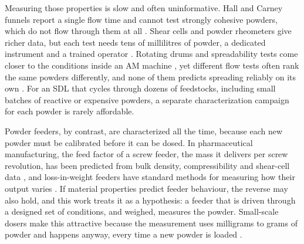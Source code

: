 \documentclass[preprint,12pt]{elsarticle}
\begin{document}
Measuring those properties is slow and often uninformative. Hall and Carney funnels report a single flow time and cannot test strongly cohesive powders, which do not flow through them at all \cite{Spierings2016Powder,Krantz2009Characterization}. Shear cells and powder rheometers give richer data, but each test needs tens of millilitres of powder, a dedicated instrument and a trained operator \cite{Schulze2021Powders,Freeman2007Measuring}. Rotating drums and spreadability tests come closer to the conditions inside an AM machine \cite{Lumay2012Measuring,Yablokova2015Rheological,Snow2019Development,Cordova2020Measuring}, yet different flow tests often rank the same powders differently, and none of them predicts spreading reliably on its own \cite{Spierings2016Powder,Krantz2009Characterization,Snow2019Development}. For an SDL that cycles through dozens of feedstocks, including small batches of reactive or expensive powders, a separate characterization campaign for each powder is rarely affordable.

Powder feeders, by contrast, are characterized all the time, because each new powder must be calibrated before it can be dosed. In pharmaceutical manufacturing, the feed factor of a screw feeder, the mass it delivers per screw revolution, has been predicted from bulk density, compressibility and shear-cell data \cite{Wang2017Predicting,Tahir2020Development,Bekaert2021Determination}, and loss-in-weight feeders have standard methods for measuring how their output varies \cite{Engisch2012Method,Engisch2015Feedrate,Hanson2018Control}. If material properties predict feeder behaviour, the reverse may also hold, and this work treats it as a hypothesis: a feeder that is driven through a designed set of conditions, and weighed, measures the powder. Small-scale dosers make this attractive because the measurement uses milligrams to grams of powder and happens anyway, every time a new powder is loaded \cite{Besenhard2015Accuracy,Besenhard2017Micro,Faulhammer2014Dose,Yang2007Metering,Alsenz2011Powderpicking}.
\end{document}

